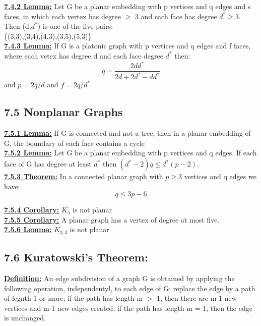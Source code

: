 \documentclass[12pt]{article}
\newcommand{\myt}[1]{\textbf{\underline{#1}}}
\begin{document}
	\myt{7.4.2 Lemma:} Let G be a planar embedding with p vertices and q edges and s faces, in which each vertex has degree $\geq$ 3 and each face has degree $d^* \geq 3$. Then (d,$d^*$) is one of the five pairs:\\
	\{(3,3),(3,4),(4,3),(3,5),(5,3)\}\\
	
	\myt{7.4.3 Lemma:} If G is a platonic graph with p vertices and q edges and f faces, where each vetex has degree d and each face degree $d^*$ then:\\
	$$q = \frac{2dd^*}{2d + 2d^* - dd^*}$$
	and $p = 2q/d$ and $f = 2q/d^*$\\
	
	\subsection*{7.5 Nonplanar Graphs}
	\myt{7.5.1 Lemma:} If G is connected and not a tree, then in a planar embedding of G, the boundary of each face contains a cycle\\
	
	\myt{7.5.2 Lemma:} Let G be a planar embedding with p vertices and q edges. If each face of G has degree at least $d^*$ then $(d^* - 2)q \leq d^*(p-2)$.\\
	
	\myt{7.5.3 Theorem:} In a connected planar graph with $p \geq 3$ vertices and q edges we have:\\
	$$q \leq 3p - 6$$
	
	\myt{7.5.4 Corollary:} $K_5$ is not planar\\
	
	\myt{7.5.5 Corollary:} A planar graph has a vertex of degree at most five.\\
	
	\myt{7.5.6 Lemma:} $K_{3,3}$ is not planar\\
	
	\subsection*{7.6 Kuratowski's Theorem:}
	
	\myt{Definition:} An edge subdivision of a graph G is obtained by applying the following operation, independentyl, to each edge of G: replace the edge by a path of legnth 1 or more; if the path has length m $>$ 1, then there are m-1 new vertices and m-1 new edges created; if the path has length m = 1, then the edge is unchanged.\\
	
\end{document}

